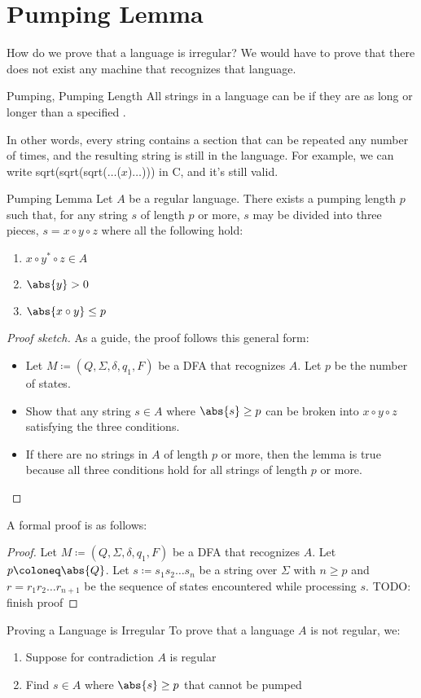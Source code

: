 \documentclass[12pt]{report}
\begin{document}
\section{Pumping Lemma}
How do we prove that a language is irregular? We would have to prove that there does not exist any machine that recognizes that language.

\begin{dfnbox}{Pumping, Pumping Length}{}
    All strings in a language can be  if they are as long or longer than a specified .
\end{dfnbox}

In other words, every string contains a section that can be repeated any number of times, and the resulting string is still in the language. For example, we can write sqrt(sqrt(sqrt($\ldots$($x$)$\ldots$))) in C, and it's still valid.

\begin{thmbox}{Pumping Lemma}{}
    Let $A$ be a regular language. There exists a pumping length $p$ such that, for any string $s$ of length $p$ or more, $s$ may be divided into three pieces, $s = x \circ y \circ z$ where all the following hold:
    \begin{enumerate}[noitemsep]
        \item $x \circ y^* \circ z \in A$
        \item $\abs{y} > 0$
        \item $\abs{x \circ y} \leq p$
    \end{enumerate}
    \tcblower
    \begin{proof}[Proof sketch]
        As a guide, the proof follows this general form:
        \begin{itemize}[noitemsep]
            \item Let $M \coloneq (Q, \Sigma, \delta, q_1, F)$ be a DFA that recognizes $A$. Let $p$ be the number of states.
            \item Show that any string $s \in A$ where $\abs{s} \geq p$ can be broken into $x \circ y \circ z$ satisfying the three conditions.
            \item If there are no strings in $A$ of length $p$ or more, then the lemma is true because all three conditions hold for all strings of length $p$ or more.
        \end{itemize}
    \end{proof}

    A formal proof is as follows:
    \begin{proof}
        Let $M \coloneq  (Q, \Sigma, \delta, q_1, F)$ be a DFA that recognizes $A$. Let $p \coloneq \abs{Q}$. Let $s \coloneq s_1 s_2 \ldots s_n$ be a string over $\Sigma$ with $n \geq p$ and $r = r_1 r_2 \ldots r_{n+1}$ be the sequence of states encountered while processing $s$.
        TODO: finish proof
    \end{proof}
\end{thmbox}

\begin{tecbox}{Proving a Language is Irregular}{}
    To prove that a language $A$ is not regular, we:
    \begin{enumerate}
        \item Suppose for contradiction $A$ is regular
        \item Find $s \in A$ where $\abs{s} \geq p$ that cannot be pumped
    \end{enumerate}
\end{tecbox}

\amzindex
\end{document}
